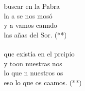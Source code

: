 \begin{cancion}%
	 buscar en la Pabra\\
	la a se nos mosó\\
	y a  vamos canndo \\
	las añas del Sor. (**) \\
	\jump\\
	 que existía en el prcipio \\
	y toon nuestras nos\\
	lo que n nuestros os \\
	eso lo que os caamos. (**)\\
\end{cancion}%
